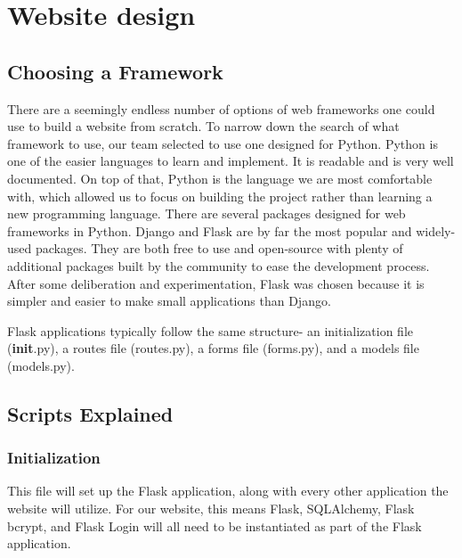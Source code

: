 \documentclass[]{book}
\begin{document}
\hypertarget{website-design}{%
\section{Website design}\label{website-design}}

\hypertarget{choosing-a-framework}{%
\subsection{Choosing a Framework}\label{choosing-a-framework}}

There are a seemingly endless number of options of web frameworks one could use to build a website from scratch. To narrow down the search of what framework to use, our team selected to use one designed for Python. Python is one of the easier languages to learn and implement. It is readable and is very well documented. On top of that, Python is the language we are most comfortable with, which allowed us to focus on building the project rather than learning a new programming language. There are several packages designed for web frameworks in Python. Django and Flask are by far the most popular and widely-used packages. They are both free to use and open-source with plenty of additional packages built by the community to ease the development process. After some deliberation and experimentation, Flask was chosen because it is simpler and easier to make small applications than Django.

Flask applications typically follow the same structure- an initialization file (\textbf{init}.py), a routes file (routes.py), a forms file (forms.py), and a models file (models.py).

\hypertarget{scripts-explained}{%
\subsection{Scripts Explained}\label{scripts-explained}}

\hypertarget{initialization}{%
\subsubsection{Initialization}\label{initialization}}

This file will set up the Flask application, along with every other application the website will utilize. For our website, this means Flask, SQLAlchemy, Flask bcrypt, and Flask Login will all need to be instantiated as part of the Flask application.
\end{document}
